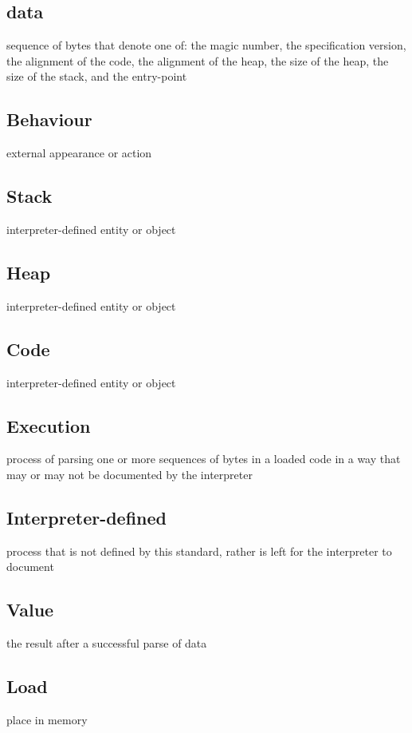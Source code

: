 \documentclass[a4paper]{article}
\begin{document}
    \subsection{data}
    sequence of bytes that denote one of: the magic number, the specification version, the alignment of the code, the alignment of the heap, the size of the heap, the size of the stack, and the entry-point

    \subsection{Behaviour}
    external appearance or action

    \subsection{Stack}
    interpreter-defined entity or object
    
    \subsection{Heap}
    interpreter-defined entity or object

    \subsection{Code}
    interpreter-defined entity or object

    \subsection{Execution}
    process of parsing one or more sequences of bytes in a loaded code in a way that may or may not be documented by the interpreter\footnotemark[1]

    \subsection{Interpreter-defined}
    process that is not defined by this standard, rather is left for the interpreter to document

    \subsection{Value}
    the result after a successful parse of data

    \subsection{Load}
    place in memory
\end{document}
